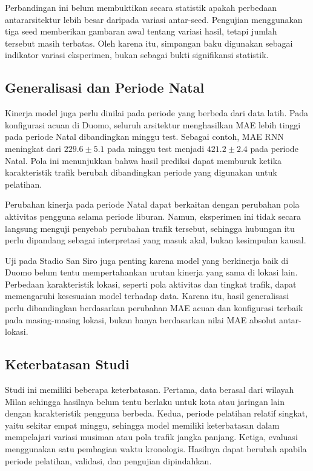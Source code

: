 \documentclass[conference,a4paper]{IEEEtran}
\begin{document}
Perbandingan ini belum membuktikan secara statistik apakah
perbedaan antararsitektur lebih besar daripada variasi
antar-seed. Pengujian menggunakan tiga seed memberikan
gambaran awal tentang variasi hasil, tetapi jumlah tersebut
masih terbatas. Oleh karena itu, simpangan baku digunakan
sebagai indikator variasi eksperimen, bukan sebagai bukti
signifikansi statistik.

\subsection{Generalisasi dan Periode Natal}

Kinerja model juga perlu dinilai pada periode yang berbeda
dari data latih. Pada konfigurasi acuan di Duomo, seluruh
arsitektur menghasilkan MAE lebih tinggi pada periode Natal
dibandingkan minggu test. Sebagai contoh, MAE RNN meningkat
dari $229.6 \pm 5.1$ pada minggu test menjadi
$421.2 \pm 2.4$ pada periode Natal. Pola ini menunjukkan
bahwa hasil prediksi dapat memburuk ketika karakteristik
trafik berubah dibandingkan periode yang digunakan untuk
pelatihan.

Perubahan kinerja pada periode Natal dapat berkaitan dengan
perubahan pola aktivitas pengguna selama periode liburan.
Namun, eksperimen ini tidak secara langsung menguji penyebab
perubahan trafik tersebut, sehingga hubungan itu perlu
dipandang sebagai interpretasi yang masuk akal, bukan
kesimpulan kausal.

Uji pada Stadio San Siro juga penting karena model yang
berkinerja baik di Duomo belum tentu mempertahankan urutan
kinerja yang sama di lokasi lain. Perbedaan karakteristik
lokasi, seperti pola aktivitas dan tingkat trafik, dapat
memengaruhi kesesuaian model terhadap data. Karena itu,
hasil generalisasi perlu dibandingkan berdasarkan perubahan
MAE acuan dan konfigurasi terbaik pada masing-masing
lokasi, bukan hanya berdasarkan nilai MAE absolut antar-lokasi.

\subsection{Keterbatasan Studi}

Studi ini memiliki beberapa keterbatasan. Pertama, data
berasal dari wilayah Milan sehingga hasilnya belum tentu
berlaku untuk kota atau jaringan lain dengan karakteristik
pengguna berbeda. Kedua, periode pelatihan relatif singkat,
yaitu sekitar empat minggu, sehingga model memiliki
keterbatasan dalam mempelajari variasi musiman atau pola
trafik jangka panjang. Ketiga, evaluasi menggunakan satu
pembagian waktu kronologis. Hasilnya dapat berubah apabila
periode pelatihan, validasi, dan pengujian dipindahkan.
\end{document}
